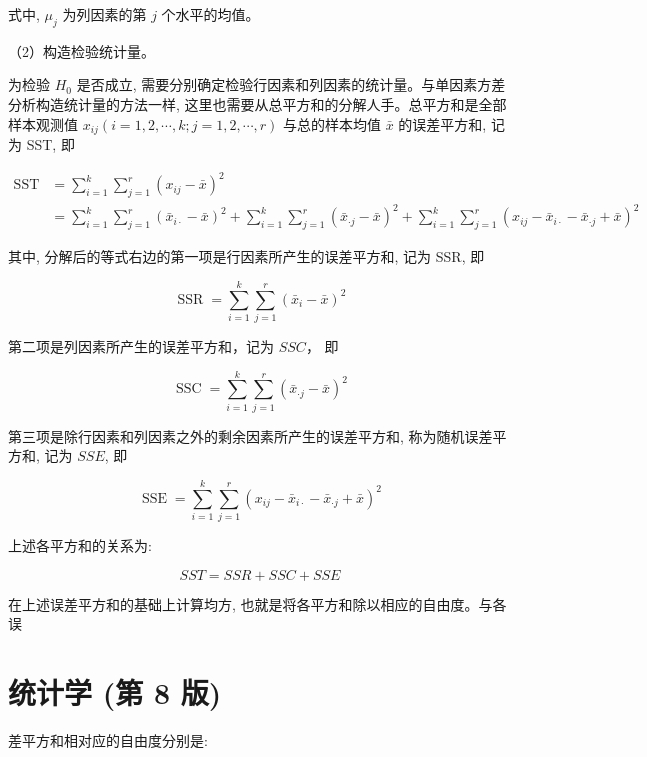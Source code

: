 \documentclass[10pt]{article}
\begin{document}
\begin{CJK*}{UTF8}{bsmi}
式中, $\mu_{j}$ 为列因素的第 $j$ 个水平的均值。

（2）构造检验统计量。

为检验 $H_{0}$ 是否成立, 需要分别确定检验行因素和列因素的统计量。与单因素方差分析构造统计量的方法一样, 这里也需要从总平方和的分解人手。总平方和是全部样本观测值 $x_{i j}(i=1,2, \cdots, k ; j=1,2, \cdots, r)$ 与总的样本均值 $\bar{x}$ 的误差平方和, 记为 SST, 即


\begin{align*}
\operatorname{SST} & =\sum_{i=1}^{k} \sum_{j=1}^{r}\left(x_{i j}-\bar{x}\right)^{2} \\
& =\sum_{i=1}^{k} \sum_{j=1}^{r}\left(\bar{x}_{i \cdot}-\bar{x}\right)^{2}+\sum_{i=1}^{k} \sum_{j=1}^{r}\left(\bar{x}_{\cdot j}-\bar{x}\right)^{2}+\sum_{i=1}^{k} \sum_{j=1}^{r}\left(x_{i j}-\bar{x}_{i \cdot}-\bar{x}_{\cdot j}+\bar{x}\right)^{2} \tag{10.15}
\end{align*}


其中, 分解后的等式右边的第一项是行因素所产生的误差平方和, 记为 SSR, 即


\begin{equation*}
\operatorname{SSR}=\sum_{i=1}^{k} \sum_{j=1}^{r}\left(\bar{x}_{i}-\bar{x}\right)^{2} \tag{10.16}
\end{equation*}


第二项是列因素所产生的误差平方和，记为 $S S C ，$ 即


\begin{equation*}
\operatorname{SSC}=\sum_{i=1}^{k} \sum_{j=1}^{r}\left(\bar{x}_{\cdot j}-\bar{x}\right)^{2} \tag{10.17}
\end{equation*}


第三项是除行因素和列因素之外的剩余因素所产生的误差平方和, 称为随机误差平方和, 记为 $S S E$, 即


\begin{equation*}
\operatorname{SSE}=\sum_{i=1}^{k} \sum_{j=1}^{r}\left(x_{i j}-\bar{x}_{i \cdot}-\bar{x}_{\cdot j}+\bar{x}\right)^{2} \tag{10.18}
\end{equation*}


上述各平方和的关系为:


\begin{equation*}
S S T=S S R+S S C+S S E \tag{10.19}
\end{equation*}


在上述误差平方和的基础上计算均方, 也就是将各平方和除以相应的自由度。与各误

\section*{统计学 (第 8 版)}
差平方和相对应的自由度分别是:


\end{CJK*}
\end{document}

